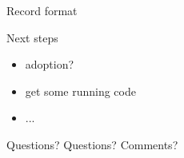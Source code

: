 \documentclass{beamer}
\begin{document}
\begin{frame}{Record format}
\end{frame}

\begin{frame}{Next steps}
  \begin{itemize}
    \item adoption?
    \item get some running code
    \item ...
  \end{itemize}
\end{frame}

\begin{frame}{Questions?}
Questions? Comments?

\end{frame}
\end{document}
